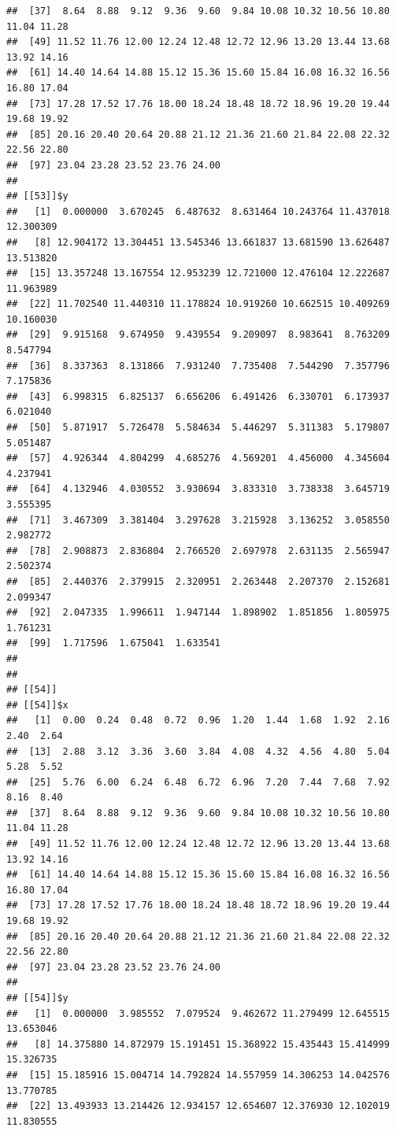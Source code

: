 \documentclass[
  ignorenonframetext,
]{beamer}
\begin{document}
\begin{frame}[fragile]{}
\begin{verbatim}
##  [37]  8.64  8.88  9.12  9.36  9.60  9.84 10.08 10.32 10.56 10.80 11.04 11.28
##  [49] 11.52 11.76 12.00 12.24 12.48 12.72 12.96 13.20 13.44 13.68 13.92 14.16
##  [61] 14.40 14.64 14.88 15.12 15.36 15.60 15.84 16.08 16.32 16.56 16.80 17.04
##  [73] 17.28 17.52 17.76 18.00 18.24 18.48 18.72 18.96 19.20 19.44 19.68 19.92
##  [85] 20.16 20.40 20.64 20.88 21.12 21.36 21.60 21.84 22.08 22.32 22.56 22.80
##  [97] 23.04 23.28 23.52 23.76 24.00
## 
## [[53]]$y
##   [1]  0.000000  3.670245  6.487632  8.631464 10.243764 11.437018 12.300309
##   [8] 12.904172 13.304451 13.545346 13.661837 13.681590 13.626487 13.513820
##  [15] 13.357248 13.167554 12.953239 12.721000 12.476104 12.222687 11.963989
##  [22] 11.702540 11.440310 11.178824 10.919260 10.662515 10.409269 10.160030
##  [29]  9.915168  9.674950  9.439554  9.209097  8.983641  8.763209  8.547794
##  [36]  8.337363  8.131866  7.931240  7.735408  7.544290  7.357796  7.175836
##  [43]  6.998315  6.825137  6.656206  6.491426  6.330701  6.173937  6.021040
##  [50]  5.871917  5.726478  5.584634  5.446297  5.311383  5.179807  5.051487
##  [57]  4.926344  4.804299  4.685276  4.569201  4.456000  4.345604  4.237941
##  [64]  4.132946  4.030552  3.930694  3.833310  3.738338  3.645719  3.555395
##  [71]  3.467309  3.381404  3.297628  3.215928  3.136252  3.058550  2.982772
##  [78]  2.908873  2.836804  2.766520  2.697978  2.631135  2.565947  2.502374
##  [85]  2.440376  2.379915  2.320951  2.263448  2.207370  2.152681  2.099347
##  [92]  2.047335  1.996611  1.947144  1.898902  1.851856  1.805975  1.761231
##  [99]  1.717596  1.675041  1.633541
## 
## 
## [[54]]
## [[54]]$x
##   [1]  0.00  0.24  0.48  0.72  0.96  1.20  1.44  1.68  1.92  2.16  2.40  2.64
##  [13]  2.88  3.12  3.36  3.60  3.84  4.08  4.32  4.56  4.80  5.04  5.28  5.52
##  [25]  5.76  6.00  6.24  6.48  6.72  6.96  7.20  7.44  7.68  7.92  8.16  8.40
##  [37]  8.64  8.88  9.12  9.36  9.60  9.84 10.08 10.32 10.56 10.80 11.04 11.28
##  [49] 11.52 11.76 12.00 12.24 12.48 12.72 12.96 13.20 13.44 13.68 13.92 14.16
##  [61] 14.40 14.64 14.88 15.12 15.36 15.60 15.84 16.08 16.32 16.56 16.80 17.04
##  [73] 17.28 17.52 17.76 18.00 18.24 18.48 18.72 18.96 19.20 19.44 19.68 19.92
##  [85] 20.16 20.40 20.64 20.88 21.12 21.36 21.60 21.84 22.08 22.32 22.56 22.80
##  [97] 23.04 23.28 23.52 23.76 24.00
## 
## [[54]]$y
##   [1]  0.000000  3.985552  7.079524  9.462672 11.279499 12.645515 13.653046
##   [8] 14.375880 14.872979 15.191451 15.368922 15.435443 15.414999 15.326735
##  [15] 15.185916 15.004714 14.792824 14.557959 14.306253 14.042576 13.770785
##  [22] 13.493933 13.214426 12.934157 12.654607 12.376930 12.102019 11.830555

\end{verbatim}
\end{frame}
\end{document}
